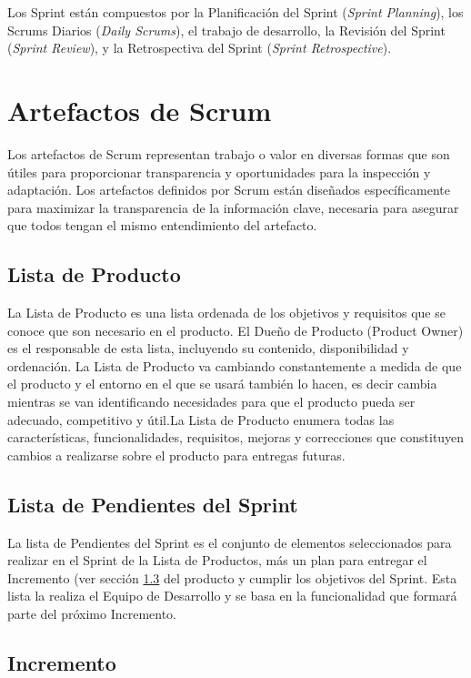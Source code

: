 Los Sprint están compuestos por la Planificación del Sprint (\textit{Sprint Planning}), los Scrums Diarios (\textit{Daily Scrums}), el trabajo de desarrollo, la Revisión del Sprint (\textit{Sprint Review}), y la Retrospectiva del Sprint (\textit{Sprint Retrospective}). 

\section{Artefactos de Scrum}
Los artefactos de Scrum representan trabajo o valor en diversas formas que son útiles para proporcionar transparencia y oportunidades para la inspección y adaptación. Los artefactos definidos por Scrum están diseñados específicamente para maximizar la transparencia de la información clave, necesaria para asegurar que todos tengan el mismo entendimiento del artefacto. \cite{scrumSchwaber}

\subsection{Lista de Producto} \label{productBacklog}
La Lista de Producto es una lista ordenada de los objetivos y requisitos que se conoce que son necesario en el producto. El Dueño de Producto (Product Owner) es el responsable de esta lista, incluyendo su contenido, disponibilidad y ordenación. La Lista de Producto va cambiando constantemente a medida de que el producto y el entorno en el que se usará también lo hacen, es decir cambia mientras se van identificando necesidades para que el producto pueda ser adecuado, competitivo y útil.La Lista de Producto enumera todas las características, funcionalidades, requisitos, mejoras y correcciones que constituyen cambios a realizarse sobre el producto para entregas futuras. \cite{scrumSchwaber}

\subsection{Lista de Pendientes del Sprint} \label{sprintBacklog}
La lista de Pendientes del Sprint es el conjunto de elementos seleccionados para realizar en el Sprint de la Lista de Productos, más un plan para entregar el Incremento (ver sección \ref{incremento} del producto y cumplir los objetivos del Sprint. \cite{scrumSchwaber} Esta lista la realiza el Equipo de Desarrollo y se basa en la funcionalidad que formará parte del próximo Incremento.

\subsection{Incremento} \label{incremento}

